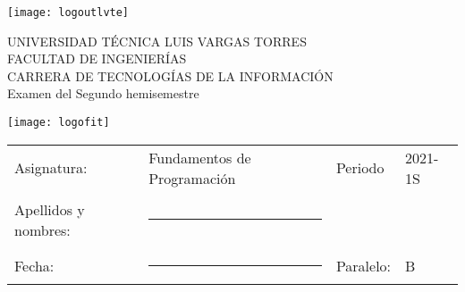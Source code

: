 \documentclass[12pt]{exam}
\begin{document}
\thispagestyle{headandfoot}


\begin{minipage}[H]{0.10\linewidth}
  \flushleft
  \texttt{[image: logoutlvte]}
\end{minipage}
\begin{minipage}[H]{0.70\linewidth}
  \begin{center}
    UNIVERSIDAD TÉCNICA LUIS VARGAS TORRES\\  FACULTAD DE INGENIERÍAS\\
    CARRERA DE TECNOLOGÍAS DE LA INFORMACIÓN \\ Examen del Segundo hemisemestre
  \end{center}
\end{minipage}
\begin{minipage}[H]{0.10\linewidth}
    \flushleft
    \texttt{[image: logofit]}
\end{minipage}

\begin{table}[H]
  \centering
  \begin{tabular}[H]{llll}
    Asignatura: & Fundamentos de Programación & Periodo & 2021-1S\\
              &                     &            & \\     
    Apellidos y nombres: &\rule{7cm}{0.4pt}    &  & \\
              &                     &            & \\
    Fecha: &\rule{5cm}{0.4pt}   & Paralelo: & {\Large B} \\
  \end{tabular}
\end{table}
\end{document}
